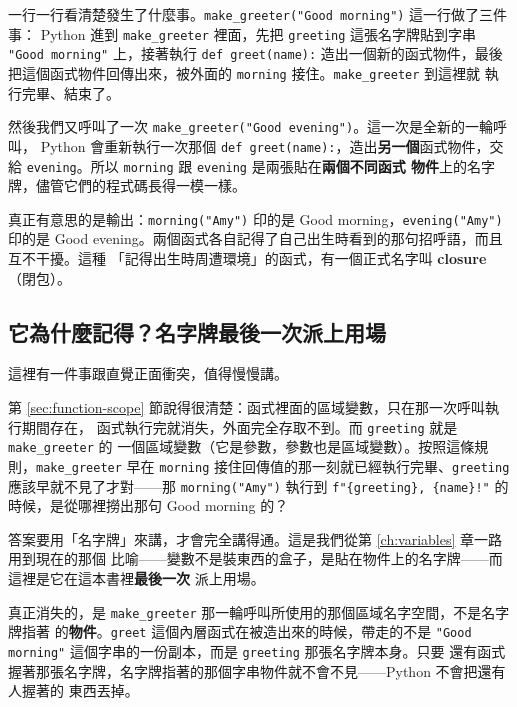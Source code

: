 
一行一行看清楚發生了什麼事。\texttt{make\_greeter("Good morning")} 這一行做了三件事：
Python 進到 \texttt{make\_greeter} 裡面，先把 \texttt{greeting} 這張名字牌貼到字串
\texttt{"Good morning"} 上，接著執行 \texttt{def greet(name):} 造出一個新的函式物件，最後
把這個函式物件回傳出來，被外面的 \texttt{morning} 接住。\texttt{make\_greeter} 到這裡就
執行完畢、結束了。

然後我們又呼叫了一次 \texttt{make\_greeter("Good evening")}。這一次是全新的一輪呼叫，
Python 會重新執行一次那個 \texttt{def greet(name):}，造出\textbf{另一個}函式物件，交給
\texttt{evening}。所以 \texttt{morning} 跟 \texttt{evening} 是兩張貼在\textbf{兩個不同函式
物件}上的名字牌，儘管它們的程式碼長得一模一樣。

真正有意思的是輸出：\texttt{morning("Amy")} 印的是 Good morning，\texttt{evening("Amy")}
印的是 Good evening。兩個函式各自記得了自己出生時看到的那句招呼語，而且互不干擾。這種
「記得出生時周遭環境」的函式，有一個正式名字叫 \textbf{closure}（閉包）。

\subsection*{它為什麼記得？名字牌最後一次派上用場}

這裡有一件事跟直覺正面衝突，值得慢慢講。

第 \ref{sec:function-scope} 節說得很清楚：函式裡面的區域變數，只在那一次呼叫執行期間存在，
函式執行完就消失，外面完全存取不到。而 \texttt{greeting} 就是 \texttt{make\_greeter} 的
一個區域變數（它是參數，參數也是區域變數）。按照這條規則，\texttt{make\_greeter} 早在
\texttt{morning} 接住回傳值的那一刻就已經執行完畢、\texttt{greeting} 應該早就不見了才對——那 \texttt{morning("Amy")}
執行到 \texttt{f"\{greeting\}, \{name\}!"} 的時候，是從哪裡撈出那句 Good morning 的？

答案要用「名字牌」來講，才會完全講得通。這是我們從第 \ref{ch:variables} 章一路用到現在的那個
比喻——變數不是裝東西的盒子，是貼在物件上的名字牌——而這裡是它在這本書裡\textbf{最後一次}
派上用場。

真正消失的，是 \texttt{make\_greeter} 那一輪呼叫所使用的那個區域名字空間，不是名字牌指著
的\textbf{物件}。\texttt{greet} 這個內層函式在被造出來的時候，帶走的不是
\texttt{"Good morning"} 這個字串的一份副本，而是 \texttt{greeting} 那張名字牌本身。只要
還有函式握著那張名字牌，名字牌指著的那個字串物件就不會不見——Python 不會把還有人握著的
東西丟掉。

